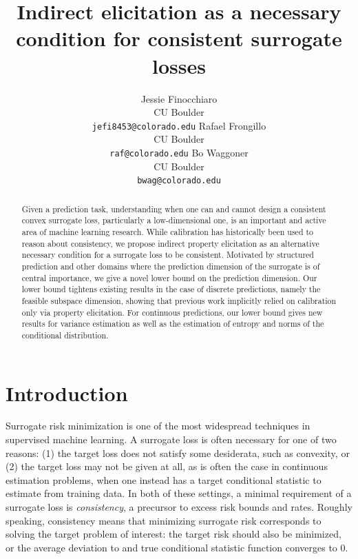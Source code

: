 \documentclass{article}
\title{Indirect elicitation as a necessary condition for consistent surrogate losses}
\author{%
  Jessie Finocchiaro\\
  CU Boulder\\
  \texttt{jefi8453@colorado.edu} 
  \And
   Rafael Frongillo\\
   CU Boulder\\
   \texttt{raf@colorado.edu} 
   \And
   Bo Waggoner\\
   CU Boulder \\
   \texttt{bwag@colorado.edu} 
}
\begin{document}
\maketitle

\begin{abstract}
Given a prediction task, understanding when one can and cannot design a consistent convex surrogate loss, particularly a low-dimensional one, is an important and active area of machine learning research. 
While calibration has historically been used to reason about consistency, we propose indirect property elicitation as an alternative necessary condition for a surrogate loss to be consistent. 
Motivated by structured prediction and other domains where the prediction dimension of the surrogate is of central importance, we give a novel lower bound on the prediction dimension. 
Our lower bound tightens existing results in the case of discrete predictions, namely the feasible subspace dimension, showing that previous work implicitly relied on calibration only via property elicitation. 
For continuous predictions, our lower bound gives new results for variance estimation as well as the estimation of entropy and norms of the conditional distribution.
\end{abstract}

\section{Introduction}\label{sec:intro}

Surrogate risk minimization is one of the most widespread techniques in supervised machine learning.
A surrogate loss is often necessary for one of two reasons: (1) the target loss does not satisfy some desiderata, such as convexity, or (2) the target loss may not be given at all, as is often the case in continuous estimation problems, when one instead has a target conditional statistic to estimate from training data.
In both of these settings, a minimal requirement of a surrogate loss is \emph{consistency}, a precursor to excess risk bounds and rates.
Roughly speaking, consistency means that minimizing surrogate risk corresponds to solving the target problem of interest:
the target risk should also be minimized, or the average deviation to and true conditional statistic function converges to 0.
\end{document}
